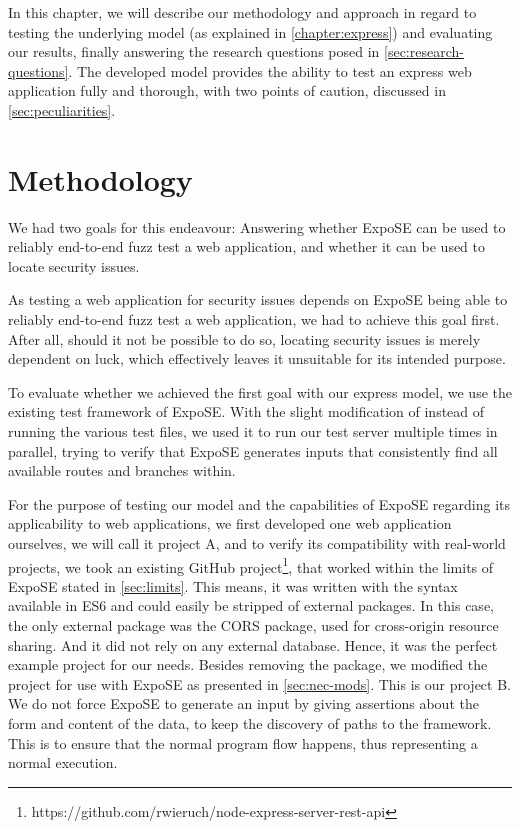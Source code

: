 In this chapter, we will describe our methodology and approach in regard to testing the underlying model (as explained in \autoref{chapter:express}) and evaluating our results, finally answering the research questions posed in \autoref{sec:research-questions}. 
The developed model provides the ability to test an express web application fully and thorough, with two points of caution, discussed in \autoref{sec:peculiarities}.

\section{Methodology} 
We had two goals for this endeavour: Answering whether ExpoSE can be used to reliably end-to-end fuzz test a web application, and whether it can be used to locate security issues.

As testing a web application for security issues depends on ExpoSE being able to reliably end-to-end fuzz test a web application, we had to achieve this goal first. After all, should it not be possible to do so, locating security issues is merely dependent on luck, which effectively leaves it unsuitable for its intended purpose. 

To evaluate whether we achieved the first goal with our express model, we use the existing test framework of ExpoSE. With the slight modification of instead of running the various test files, we used it to run our test server multiple times in parallel, trying to verify that ExpoSE generates inputs that consistently find all available routes and branches within.


For the purpose of testing our model and the capabilities of ExpoSE regarding its applicability to web applications, we first developed one web application ourselves, we will call it project A, and to verify its compatibility with real-world projects, we took an existing GitHub project\footnote{https://github.com/rwieruch/node-express-server-rest-api}, that worked within the limits of ExpoSE stated in \autoref{sec:limits}. This means, it was written with the syntax available in ES6 and could easily be stripped of external packages. In this case, the only external package was the CORS package, used for cross-origin resource sharing. And it did not rely on any external database. Hence, it was the perfect example project for our needs. Besides removing the package, we modified the project for use with ExpoSE as presented in \autoref{sec:nec-mods}. This is our project B.
We do not force ExpoSE to generate an input by giving assertions about the form and content of the data, to keep the discovery of paths to the framework. This is to ensure that the normal program flow happens, thus representing a normal execution. 

